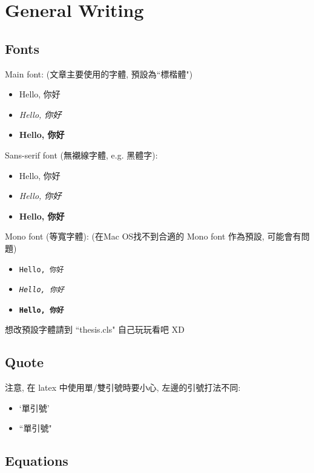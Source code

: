 \chapter{General Writing}
\label{chpater:writing}

\section{Fonts}

Main font: (文章主要使用的字體, 預設為``標楷體")
\begin{itemize}
\item Hello, 你好
\item \textit{Hello, 你好} 
\item \textbf{Hello, 你好}
\end{itemize}

Sans-serif font (無襯線字體, e.g. 黑體字):
\begin{itemize}
\item \textsf{Hello, 你好}
\item \textsf{\textit{Hello, 你好}}
\item \textsf{\textbf{Hello, 你好}}
\end{itemize}

Mono font (等寬字體):
(在Mac OS找不到合適的 Mono font 作為預設, 可能會有問題)
\begin{itemize}
\item \texttt{Hello, 你好}
\item \texttt{\textit{Hello, 你好}}  %
\item \texttt{\textbf{Hello, 你好}}  %
\end{itemize}

想改預設字體請到 ``thesis.cls" 自己玩玩看吧 XD


\section{Quote}

注意, 在 latex 中使用單/雙引號時要小心, 左邊的引號打法不同:
\begin{itemize}
\item `單引號'
\item ``單引號"
\end{itemize}

\section{Equations}

